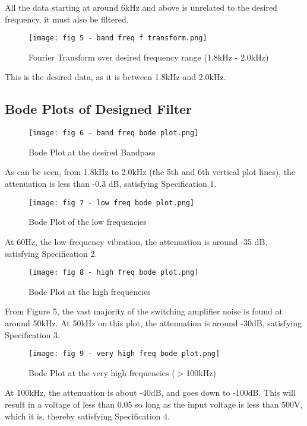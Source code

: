 \documentclass[12pt]{article}
\begin{document}
All the data starting at around 6kHz and above is unrelated to the desired frequency, it must also be filtered.

\begin{figure}[h!]
    \centering
    \texttt{[image: fig 5 - band freq f transform.png]}
    \caption{Fourier Transform over desired frequency range (1.8kHz - 2.0kHz)}
\end{figure}

This is the desired data, as it is between 1.8kHz and 2.0kHz.

\newpage

\subsection{Bode Plots of Designed Filter}

\begin{figure}[h!]
    \centering
    \texttt{[image: fig 6 - band freq bode plot.png]}
    \caption{Bode Plot at the desired Bandpass}
\end{figure}

As can be seen, from 1.8kHz to 2.0kHz (the 5th and 6th vertical plot lines), the attenuation is less than -0.3 dB, satisfying Specification 1.

\begin{figure}[h!]
    \centering
    \texttt{[image: fig 7 - low freq bode plot.png]}
    \caption{Bode Plot of the low frequencies}
\end{figure}

At 60Hz, the low-frequency vibration, the attenuation is around -35 dB, satisfying Specification 2.

\newpage

\begin{figure}[h!]
    \centering
    \texttt{[image: fig 8 - high freq bode plot.png]}
    \caption{Bode Plot at the high frequencies}
\end{figure}

From Figure 5, the vast majority of the switching amplifier noise is found at around 50kHz. At 50kHz on this plot, the attenuation is around -30dB, satisfying Specification 3.

\begin{figure}[h!]
    \centering
    \texttt{[image: fig 9 - very high freq bode plot.png]}
    \caption{Bode Plot at the very high frequencies ($>$100kHz)}
\end{figure}

At 100kHz, the attenuation is about -40dB, and goes down to -100dB. This will result in a voltage of less than 0.05 so long as the input voltage is less than 500V, which it is, thereby satisfying Specification 4.
\end{document}
